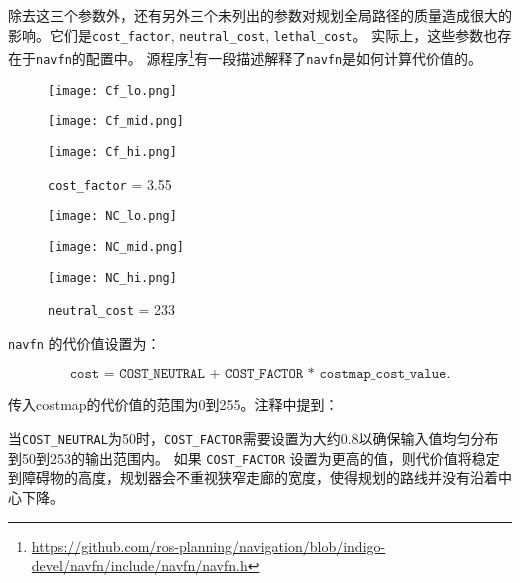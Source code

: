 
除去这三个参数外，还有另外三个未列出的参数对规划全局路径的质量造成很大的影响。它们是\texttt{cost\_factor}, \texttt{neutral\_cost}, \texttt{lethal\_cost}。
实际上，这些参数也存在于\texttt{navfn}的配置中。
源程序\footnote{\scriptsize\url{https://github.com/ros-planning/navigation/blob/indigo-devel/navfn/include/navfn/navfn.h}}有一段描述解释了\texttt{navfn}是如何计算代价值的。

%

\begin{figure}[!htb]
	\texttt{[image: Cf\_lo.png]}
	\caption{\texttt{cost\_factor} = 0.01}
	\endminipage\hfill
	\texttt{[image: Cf\_mid.png]}
	\caption{\texttt{cost\_factor} = 0.55}
	\endminipage\hfill
	\texttt{[image: Cf\_hi.png]}
	\caption{\texttt{cost\_factor} = 3.55}
	\endminipage\hfill
\end{figure}

\begin{figure}[!htb]
	\texttt{[image: NC\_lo.png]}
	\caption{\texttt{neutral\_cost} = 1}
	\endminipage\hfill
	\texttt{[image: NC\_mid.png]}
	\caption{\texttt{neutral\_cost} = 66}
	\endminipage\hfill
	\texttt{[image: NC\_hi.png]}
	\caption{\texttt{neutral\_cost} = 233}
	\endminipage\hfill
\end{figure}

\newpage


\texttt{navfn} 的代价值设置为：

$$\texttt{cost = COST\_NEUTRAL + COST\_FACTOR * costmap\_cost\_value.}$$

传入costmap的代价值的范围为0到255。注释中提到：
\begin{displayquote}
	当\texttt{COST\_NEUTRAL}为50时，\texttt{COST\_FACTOR}需要设置为大约0.8以确保输入值均匀分布到50到253的输出范围内。
	如果 \texttt{COST\_FACTOR} 设置为更高的值，则代价值将稳定到障碍物的高度，规划器会不重视狭窄走廊的宽度，使得规划的路线并没有沿着中心下降。
	
\end{displayquote}

